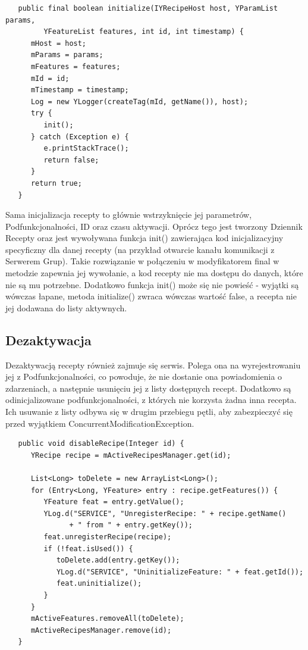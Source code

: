 \documentclass[11pt,a4paper,polish,thesis]{dcsbook}
\begin{document}
\begin{verbatim}
   public final boolean initialize(IYRecipeHost host, YParamList params,
         YFeatureList features, int id, int timestamp) {
      mHost = host;
      mParams = params;
      mFeatures = features;
      mId = id;
      mTimestamp = timestamp;
      Log = new YLogger(createTag(mId, getName()), host);
      try {
         init();
      } catch (Exception e) {
         e.printStackTrace();
         return false;
      }
      return true;
   }
\end{verbatim}

Sama inicjalizacja recepty to głównie wstrzyknięcie jej parametrów, Podfunkcjonalności, ID oraz czasu aktywacji. Oprócz tego jest tworzony Dziennik Recepty oraz jest wywoływana funkcja init() zawierająca kod inicjalizacyjny specyficzny dla danej recepty (na przykład otwarcie kanału komunikacji z Serwerem Grup). Takie rozwiązanie w połączeniu w modyfikatorem final w metodzie zapewnia jej wywołanie, a kod recepty nie ma dostępu do danych, które nie są mu potrzebne. Dodatkowo funkcja init() może się nie powieść - wyjątki są wówczas łapane, metoda initialize() zwraca wówczas wartość false, a recepta nie jej dodawana do listy aktywnych.
\subsection{Dezaktywacja}
Dezaktywacją recepty również zajmuje się serwis. Polega ona na wyrejestrowaniu jej z Podfunkcjonalności, co powoduje, że nie dostanie ona powiadomienia o zdarzeniach, a następnie usunięciu jej z listy dostępnych recept. Dodatkowo są odinicjalizowane podfunkcjonalności, z których nie korzysta żadna inna recepta. Ich usuwanie z listy odbywa się w drugim przebiegu pętli, aby zabezpieczyć się przed wyjątkiem ConcurrentModificationException.
\begin{verbatim}
   public void disableRecipe(Integer id) {
      YRecipe recipe = mActiveRecipesManager.get(id);
      
      List<Long> toDelete = new ArrayList<Long>();
      for (Entry<Long, YFeature> entry : recipe.getFeatures()) {
         YFeature feat = entry.getValue();
         YLog.d("SERVICE", "UnregisterRecipe: " + recipe.getName()
               + " from " + entry.getKey());
         feat.unregisterRecipe(recipe);
         if (!feat.isUsed()) {
            toDelete.add(entry.getKey());
            YLog.d("SERVICE", "UninitializeFeature: " + feat.getId());
            feat.uninitialize();
         }
      }
      mActiveFeatures.removeAll(toDelete);
      mActiveRecipesManager.remove(id);
   }
\end{verbatim}
\end{document}
